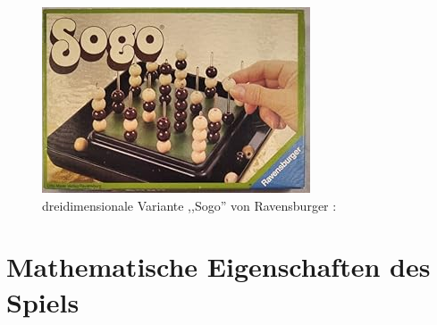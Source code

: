\begin{figure}[H]
	\centering
	\includegraphics[width=0.8\linewidth]{images/Sogo}
	\caption[Sogo von Ravensburger ]{dreidimensionale Variante ,,Sogo'' von Ravensburger :\autocite{abebooks_image}}
	\label{fig:Sogo}
\end{figure}
\newpage

\section{Mathematische Eigenschaften des Spiels}
%
%	
%

